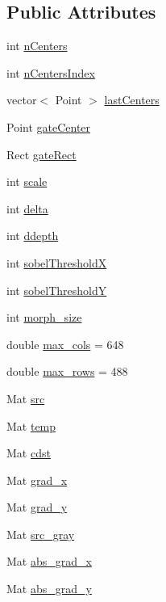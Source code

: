 \subsection*{Public Attributes}
\begin{DoxyCompactItemize}
\item 
int \hyperlink{classGateDetector_a3d49703c7ba15e0e1fe7b08350fa8017}{n\+Centers}
\item 
int \hyperlink{classGateDetector_a27ea44bd6f8d3d091418f677a7fdf197}{n\+Centers\+Index}
\item 
vector$<$ Point $>$ \hyperlink{classGateDetector_ad395280c51d04b4225609fc53f4e0c00}{last\+Centers}
\item 
Point \hyperlink{classGateDetector_af7c6c03cabdcf80173ac28ffc3a48d0c}{gate\+Center}
\item 
Rect \hyperlink{classGateDetector_aca9cf954786aeb5a0df7f7ed095b15ec}{gate\+Rect}
\item 
int \hyperlink{classGateDetector_ab8d04467e6fef95ccd54c01796c0a337}{scale}
\item 
int \hyperlink{classGateDetector_a1f21719afcda03c5ffbee39e9ce1fa90}{delta}
\item 
int \hyperlink{classGateDetector_a2da9b04c7980d392ea0bcde4b33699ab}{ddepth}
\item 
int \hyperlink{classGateDetector_a2279feb12600170f8340dfdc123a9165}{sobel\+ThresholdX}
\item 
int \hyperlink{classGateDetector_ac39590c247ad5e79466e3ce419a273d7}{sobel\+ThresholdY}
\item 
int \hyperlink{classGateDetector_ac31f77e36cc6ec62aa4b975e6b883f69}{morph\+\_\+size}
\item 
double \hyperlink{classGateDetector_a735ed4a366a55021e9e9d28c749f6b8e}{max\+\_\+cols} = 648
\item 
double \hyperlink{classGateDetector_a92e764eba1b8dce823a0605d6c333797}{max\+\_\+rows} = 488
\item 
Mat \hyperlink{classGateDetector_a491a2cf8e4a54f5f9dd40c6db70071b6}{src}
\item 
Mat \hyperlink{classGateDetector_a15e463a88c0732623798929ba696f693}{temp}
\item 
Mat \hyperlink{classGateDetector_af10ae6041a8ef84096ca56db35c41589}{cdst}
\item 
Mat \hyperlink{classGateDetector_aa4741858496c4f6e88690731d2aaceb0}{grad\+\_\+x}
\item 
Mat \hyperlink{classGateDetector_aa97f7b7861a99fb55505b3dc6a2c0e65}{grad\+\_\+y}
\item 
Mat \hyperlink{classGateDetector_ad66d72fc2bd9f66ef5fbf9e012d2deea}{src\+\_\+gray}
\item 
Mat \hyperlink{classGateDetector_a43f0a1989a295d2425f4a827cf566895}{abs\+\_\+grad\+\_\+x}
\item 
Mat \hyperlink{classGateDetector_a2ea407b651147e92ebf628ec23844634}{abs\+\_\+grad\+\_\+y}
\end{DoxyCompactItemize}


